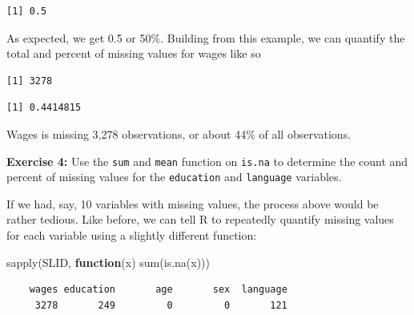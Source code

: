 \documentclass[
]{book}
\makeatletter
\newenvironment{Shaded}{\begin{snugshade}}{\end{snugshade}}
\newcommand{\ControlFlowTok}[1]{\textcolor[rgb]{0.27,0.27,0.27}{\textbf{#1}}}
\newcommand{\FunctionTok}[1]{\textcolor[rgb]{0,0,0}{#1}}
\newcommand{\NormalTok}[1]{#1}
\newcommand{\SpecialCharTok}[1]{\textcolor[rgb]{0,0,0}{#1}}
\newenvironment{kframe}{%
\medskip{}
\setlength{\fboxsep}{.8em}
 \def\at@end@of@kframe{}%
 \ifinner\ifhmode%
  \def\at@end@of@kframe{\end{minipage}}%
  \begin{minipage}{\columnwidth}%
 \fi\fi%
 \def\FrameCommand##1{\hskip\@totalleftmargin \hskip-\fboxsep
 \colorbox{shadecolor}{##1}\hskip-\fboxsep
     \hskip-\linewidth \hskip-\@totalleftmargin \hskip\columnwidth}%
 \MakeFramed {\advance\hsize-\width
   \@totalleftmargin\z@ \linewidth\hsize
   \@setminipage}}%
 {\par\unskip\endMakeFramed%
 \at@end@of@kframe}
\renewenvironment{Shaded}{\begin{kframe}}{\end{kframe}}
\newenvironment{rmdblock}[1]
  {\begin{shaded*}
  }
  {\end{shaded*}
  }
\newenvironment{learncheck}
  {\begin{rmdblock}{warning}}
  {\end{rmdblock}}
\makeatother
\begin{document}
\begin{verbatim}
[1] 0.5
\end{verbatim}

As expected, we get 0.5 or 50\%. Building from this example, we can quantify the total and percent of missing values for wages like so

\begin{Shaded}
\end{Shaded}

\begin{verbatim}
[1] 3278
\end{verbatim}

\begin{Shaded}
\end{Shaded}

\begin{verbatim}
[1] 0.4414815
\end{verbatim}

Wages is missing 3,278 observations, or about 44\% of all observations.

\begin{learncheck}
\textbf{Exercise 4:} Use the \texttt{sum} and \texttt{mean} function on
\texttt{is.na} to determine the count and percent of missing values for
the \texttt{education} and \texttt{language} variables.
\end{learncheck}

If we had, say, 10 variables with missing values, the process above would be rather tedious. Like before, we can tell R to repeatedly quantify missing values for each variable using a slightly different function:

\begin{Shaded}
\begin{Highlighting}[]
\FunctionTok{sapply}\NormalTok{(SLID, }\ControlFlowTok{function}\NormalTok{(x) }\FunctionTok{sum}\NormalTok{(}\FunctionTok{is.na}\NormalTok{(x)))}
\end{Highlighting}
\end{Shaded}

\begin{verbatim}
    wages education       age       sex  language 
     3278       249         0         0       121 
\end{verbatim}
\end{document}
